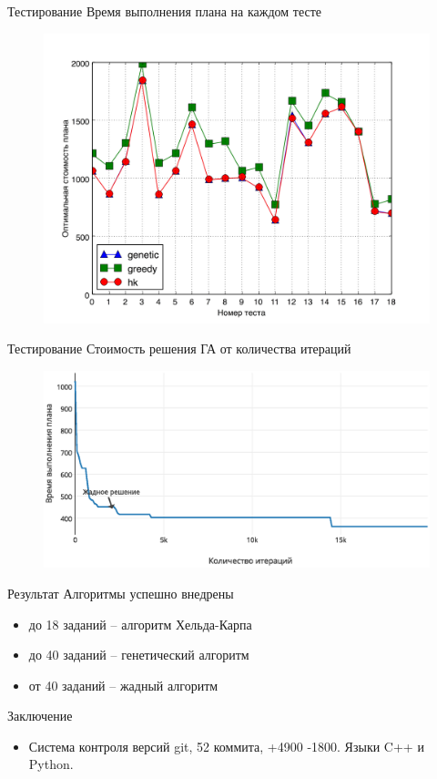 \documentclass{beamer}
\begin{document}
\begin{frame}{Тестирование}
Время выполнения плана на каждом тесте
\begin{figure}[here]
    \includegraphics[scale=0.5]{images/test_small1.jpg}
\end{figure}

\end{frame}


\begin{frame}{Тестирование}
Стоимость решения ГА от количества итераций
\begin{figure}[here]
    \includegraphics[scale=0.5]{images/iter-value-20-plot.eps}
\end{figure}

\end{frame}

\begin{frame}{Результат}
Алгоритмы успешно внедрены
\begin{itemize}
\item до 18 заданий -- алгоритм Хельда-Карпа
\item до 40 заданий -- генетический алгоритм
\item от 40 заданий -- жадный алгоритм
\end{itemize}
\end{frame}

\begin{frame}{Заключение}
\begin{itemize}
\item Система контроля версий git, 52 коммита, +4900 -1800. Языки C++ и Python.
\end{itemize}

\end{frame}
\end{document}
